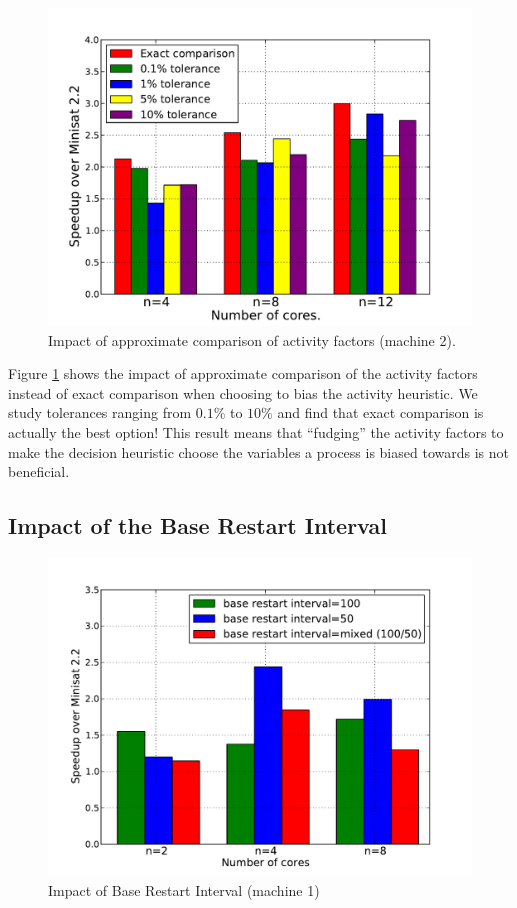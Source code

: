 \documentclass[letterpaper, compsoc, conference]{IEEEtran}
\begin{document}
\begin{figure}[htbp]
  \includegraphics[width=\columnwidth]{images/aff.pdf}
  \caption{Impact of approximate comparison of activity factors (machine 2).}
  \label{fig:aff}
\end{figure}

Figure \ref{fig:aff} shows the impact of approximate comparison of the activity
factors instead of exact comparison when choosing to bias the activity
heuristic.  We study tolerances ranging from $0.1\%$ to $10\%$ and find that
exact comparison is actually the best option! This result means that
``fudging'' the activity factors to make the decision heuristic choose the
variables a process is biased towards is not beneficial.

\subsection{Impact of the Base Restart Interval}

\begin{figure}[htbp]
  \includegraphics[width=\columnwidth]{images/restart_speedup1.pdf}
  \caption{Impact of Base Restart Interval (machine 1)}
  \label{fig:restart}
\end{figure}
\end{document}
